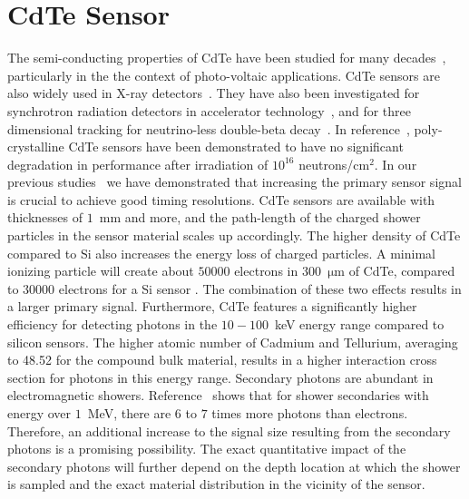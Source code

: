 %
%
%
\section{CdTe Sensor}
\label{sec:siliconpad}
The semi-conducting properties of CdTe have been studied for many decades~\cite{cdtegeneric}, 
particularly in the the context of photo-voltaic applications.
CdTe sensors are also widely used in X-ray detectors~\cite{cdtesensorsgeneric,cdtesensors2,cdtesensors3}. 
They have also been investigated for synchrotron radiation detectors in accelerator 
technology~\cite{cdtelhc}, and for three dimensional tracking for neutrino-less 
double-beta decay~\cite{Filipenko:2014zta}. In reference~\cite{cdtelhc,cdtelhc2}, poly-crystalline 
CdTe sensors have been demonstrated to have no significant degradation in
performance after irradiation of $10^{16}$ neutrons/$\mathrm{cm}^{2}$. In our previous 
studies~\cite{Anderson:2015gha,MCPShowerMaxPaper,Ronzhin201552,SiliconTiming,PixelatedMCP,Anderson:2016ygg,Anderson:2015tia} 
we have demonstrated that increasing the primary sensor signal is crucial to achieve good timing resolutions.  
CdTe sensors are available with thicknesses of $1$~mm and more, and the path-length of the charged 
shower particles in the sensor material scales up accordingly. The higher density of CdTe compared 
to Si also increases the energy loss of charged particles. 
A minimal ionizing particle will create about $50000$ electrons in 300~$\mathrm{\mu}$m 
of CdTe, compared to $30000$ electrons for a Si sensor \cite{cdtelhc2}.  The combination of these
two effects results in a larger primary signal. Furthermore, CdTe features 
a significantly higher efficiency for detecting photons in the $10-100$~keV energy range 
compared to silicon sensors. The higher atomic number of Cadmium and Tellurium, averaging 
to 48.52 for the compound bulk material, results in a higher interaction cross section for 
photons in this energy range. Secondary photons are abundant in electromagnetic showers. 
Reference~\cite{Beringer:1900zz} shows that for shower secondaries with energy over 
$1$~MeV, there are $6$ to $7$ times more photons than electrons. Therefore, an 
additional increase to the signal size resulting from the secondary photons is a promising 
possibility. The exact quantitative impact of the secondary photons will further depend 
on the depth location at which the shower is sampled and the exact material distribution 
in the vicinity of the sensor. 

